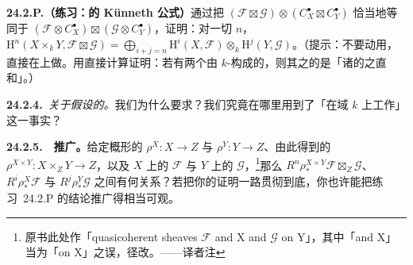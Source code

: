 \textbf{24.2.P.（练习：\trQCSheaf{}的 K\"unneth 公式）}\quad 通过把 $(\mathscr{F}\boxtimes\mathscr{G})\otimes(C^{\bullet}_X\boxtimes C^{\bullet}_Y)$ 恰当地等同于 $(\mathscr{F}\otimes C^{\bullet}_X)\boxtimes(\mathscr{G}\otimes C^{\bullet}_Y)$，证明：对一切 $n$，$\mathrm{H}^n(X\times_k Y,\mathscr{F}\boxtimes\mathscr{G})=\bigoplus_{i+j=n}\mathrm{H}^i(X,\mathscr{F})\otimes_k\mathrm{H}^j(Y,\mathscr{G})$。（提示：不要动用\trSpectralSequence，直接在\trComplexN{}上做。用直接计算证明：若有两个由 $k$-\trModule{}构成的\trComplexN，则其\trTensorProduct{}之\trTotalComplex{}的\trCohomology{}是「诸\trCohomology{}的\trTensorProduct{}之直和」。）

\textbf{24.2.4.}\ \emph{关于假设的\trhRemark。}\quad 我们为什么要求\trQC？我们究竟在哪里用到了「在域 $k$ 上工作」这一事实？

\textbf{24.2.5.}\ \extrahard\ \textbf{推广。}\quad 给定概形的\trQuasicompact\trSeparated{}\trMorphism{} $\rho^X\colon X\to Z$ 与 $\rho^Y\colon Y\to Z$、由此得到的 $\rho^{X\times Y}\colon X\times_Z Y\to Z$，以及 $X$ 上的\trQCSheaf{} $\mathscr{F}$ 与 $Y$ 上的\trQCSheaf{} $\mathscr{G}$，\footnote{原书此处作「quasicoherent sheaves $\mathscr{F}$ and X and $\mathscr{G}$ on Y」，其中「and X」当为「on X」之误，径改。——译者注}那么 $R^n\rho^{X\times Y}_*\mathscr{F}\boxtimes_Z\mathscr{G}$、$R^i\rho^X_*\mathscr{F}$ 与 $R^j\rho^Y_*\mathscr{G}$ 之间有何关系？若把你的证明一路贯彻到底，你也许能把\mbox{练习~24.2.P} 的结论推广得相当可观。
